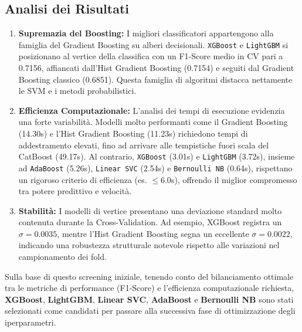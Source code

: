 \subsection{Analisi dei Risultati}
\begin{enumerate}
    \item \textbf{Supremazia del Boosting:} I migliori classificatori appartengono alla famiglia del Gradient Boosting su alberi decisionali. \texttt{XGBoost} e \texttt{LightGBM} si posizionano al vertice della classifica con un F1-Score medio in CV pari a 0.7156, affiancati dall'Hist Gradient Boosting (0.7154) e seguiti dal Gradient Boosting classico (0.6851). Questa famiglia di algoritmi distacca nettamente le SVM e i metodi probabilistici.
    \item \textbf{Efficienza Computazionale:} L'analisi dei tempi di esecuzione evidenzia una forte variabilità. Modelli molto performanti come il Gradient Boosting (14.30s) e l'Hist Gradient Boosting (11.23s) richiedono tempi di addestramento elevati, fino ad arrivare alle tempistiche fuori scala del CatBoost (49.17s). Al contrario, \texttt{XGBoost} (3.01s) e \texttt{LightGBM} (3.72s), insieme ad \texttt{AdaBoost} (5.26s), \texttt{Linear SVC} (2.54s) e \texttt{Bernoulli NB} (0.64s), rispettano un rigoroso criterio di efficienza (es. \(\le 6.0\)s), offrendo il miglior compromesso tra potere predittivo e velocità.
    \item \textbf{Stabilità:} I modelli di vertice presentano una deviazione standard molto contenuta durante la Cross-Validation. Ad esempio, XGBoost registra un \(\sigma = 0.0035\), mentre l'Hist Gradient Boosting segna un eccellente \(\sigma = 0.0022\), indicando una robustezza strutturale notevole rispetto alle variazioni nel campionamento dei fold.
\end{enumerate}

\noindent
Sulla base di questo screening iniziale, tenendo conto del bilanciamento ottimale tra le metriche di performance (F1-Score) e l'efficienza computazionale richiesta, \textbf{XGBoost}, \textbf{LightGBM}, \textbf{Linear SVC}, \textbf{AdaBoost} e \textbf{Bernoulli NB} sono stati selezionati come candidati per passare alla successiva fase di ottimizzazione degli iperparametri.
